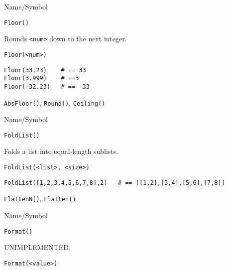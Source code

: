 \rl




\begin{desc}{Name/Symbol}
\item[Name/Symbol]	\verb+Floor()+

\item[Description]	Rounds \verb+<num>+ down to the next integer.

\item[Usage]
\begin{verbatim}
Floor(<num>)
\end{verbatim}

\item[Example]
\begin{verbatim}
Floor(33.23)	# == 33
Floor(3.999)  	# ==3
Floor(-32.23) 	# == -33
\end{verbatim}
 
\item[See Also]	\verb+AbsFloor()+, \verb+Round()+, \verb+Ceiling()+
\end{desc}

\rl


\begin{desc}{Name/Symbol}
\item[Name/Symbol]	\verb+FoldList()+

\item[Description]	Folds a list into equal-length sublists.

\item[Usage]
\begin{verbatim}
FoldList(<list>, <size>)
\end{verbatim}

\item[Example]
\begin{verbatim}
FoldList([1,2,3,4,5,6,7,8],2)	# == [[1,2],[3,4],[5,6],[7,8]]
\end{verbatim}
 
\item[See Also]	\verb+FlattenN()+, \verb+Flatten()+
\end{desc}

\rl



\begin{desc}{Name/Symbol}
\item[Name/Symbol]	\verb+Format()+            

\item[Description]	UNIMPLEMENTED.

\item[Usage]
\begin{verbatim}
Format(<value>)
\end{verbatim}

\item[Example]	

\item[See Also]	
\end{desc}

